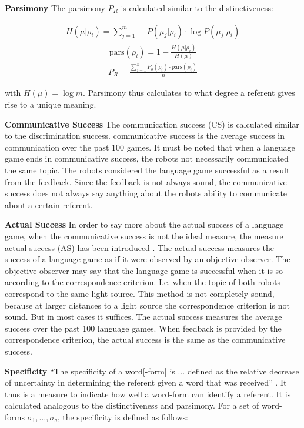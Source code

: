 \begin{description}
\item {\bf Parsimony} The parsimony $P_R$ is calculated similar to the distinctiveness:

\begin{eqnarray}
H(\mu|\rho_i)=\sum_{j=1}^m -P(\mu_j|\rho_i) \cdot \log P(\mu_j|\rho_i)
\end{eqnarray}
\begin{eqnarray}
\mbox{pars}(\rho_i)=1-\frac{H(\mu|\rho_i)}{H(\mu)}
\end{eqnarray}
\begin{eqnarray}
P_R=\frac{\sum_{i=1}^n P_o(\rho_i) \cdot \mbox{pars}(\rho_i)}{n}
\end{eqnarray}


with $H(\mu)= \log m$. Parsimony thus calculates to what degree a referent gives rise to a unique meaning.

\item {\bf Communicative Success} The communication success
(CS) is calculated similar to the discrimination success. communicative success is the average success in communication
over the past 100 games. It must be noted that when a language
game ends in communicative success, the robots not necessarily
communicated the same topic. The robots considered the language
game successful as a result from the feedback. Since the feedback is not always sound, the communicative success does not always say anything about
the robots ability to communicate about a certain referent.

\item {\bf Actual Success} In order to say more about the
actual success of a language game, when the communicative success is not the ideal measure, the measure actual success (AS) has been introduced \citep{vogt:1998b}. The actual success
measures the success of a language game as if it were observed
by an objective observer. The objective observer may say that the language game is successful when it is so according to the correspondence criterion. I.e. when the topic of both robots correspond to the same light source. This method is not completely sound, because at larger distances to a light source the correspondence criterion is not sound. But in most cases it suffices. The actual success measures the
average success over the past 100 language games. When feedback is provided by the correspondence criterion, the actual success is the same as the communicative success.

\item {\bf Specificity} ``The specificity of a word[-form] is ... defined as the relative decrease of uncertainty in determining the referent given a word that was received'' \citep{dejong:2000}. It thus is a measure to indicate how well a word-form can identify a referent. It is calculated analogous to the distinctiveness and parsimony. For a set of word-forms $\sigma_1,\ldots,\sigma_q$, the specificity is defined as follows:


\end{description}
